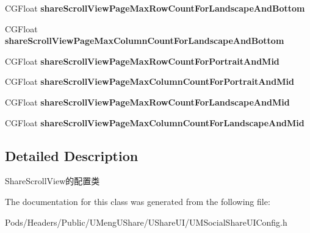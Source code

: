 \begin{DoxyCompactItemize}
\item 
\mbox{\label{interface_u_m_social_share_page_scroll_view_config_aac993535e0b02ef519ca7467d0d2647d}} 
C\+G\+Float {\bfseries share\+Scroll\+View\+Page\+Max\+Row\+Count\+For\+Landscape\+And\+Bottom}
\item 
\mbox{\label{interface_u_m_social_share_page_scroll_view_config_abf53db30dc7bc956c72dd53ef29d76aa}} 
C\+G\+Float {\bfseries share\+Scroll\+View\+Page\+Max\+Column\+Count\+For\+Landscape\+And\+Bottom}
\item 
\mbox{\label{interface_u_m_social_share_page_scroll_view_config_a393a63582dc08249592662980c96b6a8}} 
C\+G\+Float {\bfseries share\+Scroll\+View\+Page\+Max\+Row\+Count\+For\+Portrait\+And\+Mid}
\item 
\mbox{\label{interface_u_m_social_share_page_scroll_view_config_af5bfd77d33342674cc37f18a911a97c7}} 
C\+G\+Float {\bfseries share\+Scroll\+View\+Page\+Max\+Column\+Count\+For\+Portrait\+And\+Mid}
\item 
\mbox{\label{interface_u_m_social_share_page_scroll_view_config_a738a57e6ae32240ffed4415c06ababc8}} 
C\+G\+Float {\bfseries share\+Scroll\+View\+Page\+Max\+Row\+Count\+For\+Landscape\+And\+Mid}
\item 
\mbox{\label{interface_u_m_social_share_page_scroll_view_config_aec42ee51b014c7c0093d45b9ff08aba9}} 
C\+G\+Float {\bfseries share\+Scroll\+View\+Page\+Max\+Column\+Count\+For\+Landscape\+And\+Mid}
\end{DoxyCompactItemize}


\subsection{Detailed Description}
Share\+Scroll\+View的配置类 

The documentation for this class was generated from the following file\+:\begin{DoxyCompactItemize}
\item 
Pods/\+Headers/\+Public/\+U\+Meng\+U\+Share/\+U\+Share\+U\+I/U\+M\+Social\+Share\+U\+I\+Config.\+h\end{DoxyCompactItemize}
